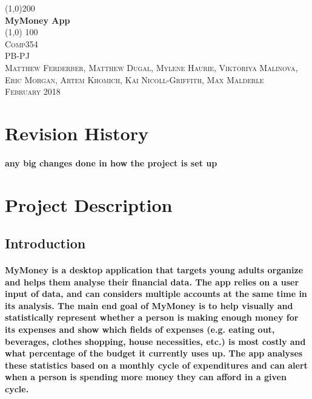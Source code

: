 \documentclass{article}
\begin{document}
\begin {titlepage}
    \begin{center}
   \line(1,0){200} \\
    \huge{\bfseries MyMoney App}\\
    \line (1,0) {100} \\
    [1.5cm]
    \textsc{\LARGE Comp354}\\
    [1cm]
    \textsc{\large PB-PJ}\\
    [3 cm]
    \textsc{\large Matthew Ferderber, Matthew Dugal, Mylene Haurie, Viktoriya Malinova, Eric Morgan, Artem Khomich, \break Kai Nicoll-Griffith, Max Malderle }\\
    [6cm]
    \textsc{\large February 2018}\\

    \end{center}
\end{titlepage}

\fontsize{11pt}{13pt}\selectfont
\setlength{\parindent}{13 pt}

\newpage
 \section {Revision History}
 \paragraph{\indent any big changes done in how the project is set up}
 
\newpage
\tableofcontents


\newpage
\section {Project Description}

\subsection{Introduction}
\paragraph{\indent MyMoney is a desktop application that targets young adults organize and helps them analyse their financial data. The app relies on a user input of data, and can considers multiple accounts at the same time in its analysis. The main end goal of MyMoney is to help visually and statistically represent whether a person is making enough money for its expenses and show which fields of expenses (e.g. eating out, beverages, clothes shopping, house necessities, etc.) is most costly and what percentage of the budget it currently uses up. The app analyses these statistics based on a monthly cycle of expenditures and can alert when a person is spending more money they can afford in a given cycle. }
\end{document}
